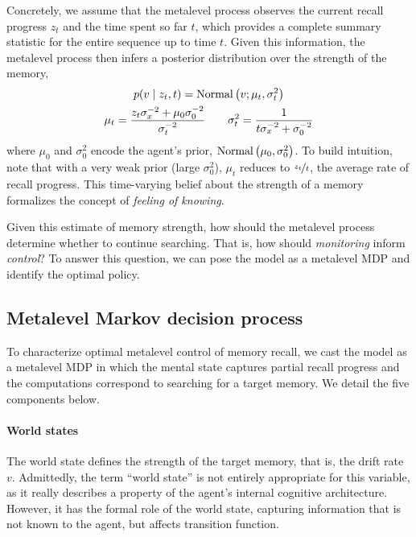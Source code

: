 Concretely, we assume that the metalevel process observes the current recall progress $z_t$ and the time spent so far $t$, which provides a complete summary statistic for the entire sequence up to time $t$. Given this information, the metalevel process then infers a posterior distribution over the strength of the memory,
%
\begin{equation}\label{eq:belief}
\begin{gathered}
  p(v \mid z_t, t) = \mathrm{Normal}\left( v; \mu_t, \sigma_t^2 \right) \\
  \mu_t = \frac{z_t \sigma_x^{-2} + \mu_0 \sigma_0^{-2}}{\sigma_t^{-2}} 
  \quad\quad
  \sigma_t^2 = \frac{1}{t \sigma_x^{-2} + \sigma_0^{-2}}
\end{gathered}
\end{equation}
%
where $\mu_0$ and $\sigma_0^2$ encode the agent's prior, $\mathrm{Normal}\left( \mu_0, \sigma_0^2 \right)$. To build intuition, note that with a very weak prior (large $\sigma_0^2$), $\mu_t$ reduces to $\nicefrac{z_t}{t}$, the average rate of recall progress. This time-varying belief about the strength of a memory formalizes the concept of \emph{feeling of knowing}.

Given this estimate of memory strength, how should the metalevel process determine whether to continue searching. That is, how should \emph{monitoring} inform \emph{control}? To answer this question, we can pose the model as a metalevel MDP and identify the optimal policy.

\subsection{Metalevel Markov decision process}

To characterize optimal metalevel control of memory recall, we cast the model as a metalevel MDP in which the mental state captures partial recall progress and the computations correspond to searching for a target memory. We detail the five components below.


\paragraph{World states}
The world state defines the strength of the target memory, that is, the drift rate $v$. Admittedly, the term ``world state'' is not entirely appropriate for this variable, as it really describes a property of the agent's internal cognitive architecture. However, it has the formal role of the world state, capturing information that is not known to the agent, but affects transition function.

